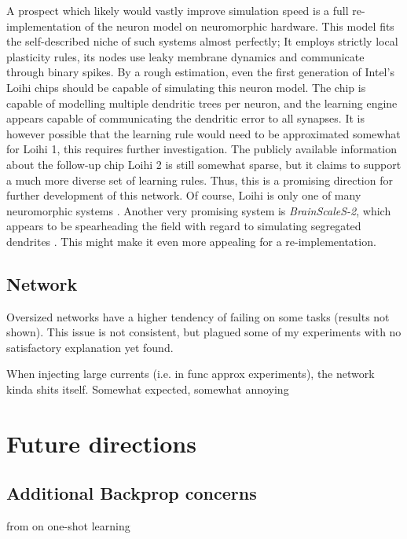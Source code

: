 A prospect which likely would vastly improve simulation speed is a full re-implementation of the neuron model on
neuromorphic hardware. This model fits the self-described niche of such systems almost perfectly; It employs strictly
local plasticity rules, its nodes use leaky membrane dynamics and communicate through binary spikes. By a rough
estimation, even the first generation of Intel's Loihi chips \citep{davies2018loihi} should be capable of simulating
this neuron model. The chip is capable of modelling multiple dendritic trees per neuron, and the learning engine appears
capable of communicating the dendritic error to all synapses. It is however possible that the learning rule would need
to be approximated somewhat for Loihi 1, this requires further investigation. The publicly available information about
the follow-up chip Loihi 2 \citep{Davies2021} is still somewhat sparse, but it claims to support a much more diverse set
of learning rules. Thus, this is a promising direction for further development of this network. Of course, Loihi is only
one of many neuromorphic systems \citep{rajendran2019low}. Another very promising system is \textit{BrainScaleS-2},
which appears to be spearheading the field with regard to simulating segregated dendrites \citep{Kaiser2022}. This
might make it even more appealing for a re-implementation.




\subsection*{Network}

Oversized networks have a higher tendency of failing on some tasks (results not shown). This issue is not consistent,
but plagued some of my experiments with no satisfactory explanation yet found.


When injecting large currents (i.e. in func approx experiments), the network kinda shits itself. Somewhat
expected, somewhat annoying




\section{Future directions}

\subsection{Additional Backprop concerns}


from \citep{Marblestone2016} on one-shot learning

